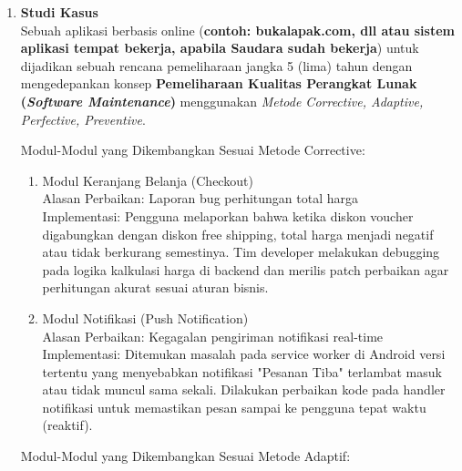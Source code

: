 \begin{enumerate}[leftmargin=*, label=\textbf{\arabic*.}]
            \clearpage

      \item \textbf{Studi Kasus} \\
            Sebuah aplikasi berbasis online (\textbf{contoh: bukalapak.com, dll atau sistem aplikasi tempat bekerja, apabila Saudara sudah bekerja}) untuk dijadikan sebuah rencana pemeliharaan jangka 5 (lima) tahun dengan mengedepankan konsep \textbf{Pemeliharaan Kualitas Perangkat Lunak (\textit{Software Maintenance})} menggunakan \textit{Metode Corrective, Adaptive, Perfective, Preventive}.

            \vspace{0.5cm}

            Modul-Modul yang Dikembangkan Sesuai Metode Corrective:

            \begin{enumerate}[leftmargin=0.5cm, label=\textbf{\arabic*.}]
                  \item Modul Keranjang Belanja (Checkout)\\
                        Alasan Perbaikan: Laporan bug perhitungan total harga\\
                        Implementasi: Pengguna melaporkan bahwa ketika diskon voucher digabungkan dengan diskon free shipping, total harga menjadi negatif atau tidak berkurang semestinya. Tim developer melakukan debugging pada logika kalkulasi harga di backend dan merilis patch perbaikan agar perhitungan akurat sesuai aturan bisnis.\\
                  \item Modul Notifikasi (Push Notification)\\
                        Alasan Perbaikan: Kegagalan pengiriman notifikasi real-time\\
                        Implementasi: Ditemukan masalah pada service worker di Android versi tertentu yang menyebabkan notifikasi "Pesanan Tiba" terlambat masuk atau tidak muncul sama sekali. Dilakukan perbaikan kode pada handler notifikasi untuk memastikan pesan sampai ke pengguna tepat waktu (reaktif).
            \end{enumerate}

            \vspace{0.5cm}

            Modul-Modul yang Dikembangkan Sesuai Metode Adaptif:


\end{enumerate}
